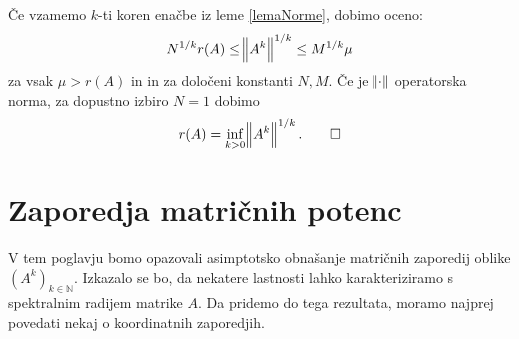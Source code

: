 \documentclass[mat1]{fmfdelo}
\newcommand{\N}{\mathbb N}
\begin{document}
\begin{dokaz}
    Če vzamemo $k$-ti koren enačbe iz leme \ref{lemaNorme}, dobimo oceno:
    \begin{equation*}
        N^{1/k} r(A) \leq \norm{A^k}^{1/k} \leq M^{1/k} \mu
    \end{equation*}
    za vsak $\mu > r(A)$ in in za določeni konstanti $N, M$. Če je $\norm{\cdot}$ operatorska norma, za dopustno izbiro $N = 1$ dobimo
    \[r(A) = \inf_{k > 0} \norm{A^k}^{1/k}. \qedhere\]
\end{dokaz}


\section{Zaporedja matričnih potenc}
V tem poglavju bomo opazovali asimptotsko obnašanje matričnih zaporedij oblike $(A^k)_{k\in\N}$. Izkazalo se bo, da nekatere lastnosti lahko karakteriziramo s spektralnim radijem matrike $A$. Da pridemo do tega rezultata, moramo najprej povedati nekaj o koordinatnih zaporedjih.
\end{document}
